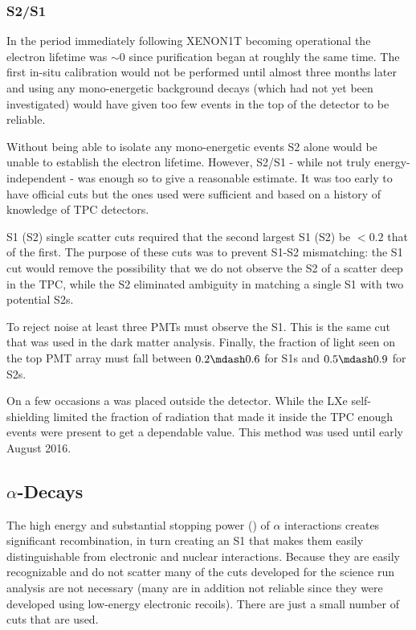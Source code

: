 \subsubsection{S2/S1}
\label{subsubsec:electron_lifetimes_measurement_ss}
In the period immediately following XENON1T becoming operational the electron lifetime was ${\sim} 0$ since purification began at roughly
the same time.  The first in-situ calibration would not be performed until almost three months later and using any mono-energetic
background decays (which had not yet been investigated) would have given too few events in the top of the detector to be reliable.

Without being able to isolate any mono-energetic events S2 alone would be unable to establish the electron lifetime.  However,
S2/S1 - while not truly energy-independent - was enough so to give a reasonable estimate.  It was too early to have official cuts but
the ones used were sufficient and based on a history of knowledge of TPC detectors.

S1 (S2) single scatter cuts required that the second largest S1 (S2) be $< 0.2$ that of the first.  The purpose of these cuts was to
prevent S1-S2 mismatching: the S1 cut would
remove the possibility that we do not observe the S2 of a scatter deep in the TPC, while the S2 eliminated ambiguity in matching a single
S1 with two potential S2s.

To reject noise at least three PMTs must observe the S1.  This is the same cut that was used in the dark matter analysis.  Finally, the
fraction of light seen on the top PMT array must fall between $0.2 \mdash 0.6$ for S1s and $0.5 \mdash 0.9$ for S2s.

On a few occasions a  was placed outside the detector.  While the LXe self-shielding limited the fraction of radiation that
made it inside the TPC enough events were present to get a dependable value.  This method was used until early August 2016.



\subsection{$\alpha$-Decays}
\label{subsec:electron_lifetimes_measurement_alphas}
The high energy and substantial stopping power () of $\alpha$ interactions creates significant
recombination, in turn creating an S1 that makes them easily distinguishable from electronic and nuclear
interactions.  Because they are easily recognizable and do not scatter many of the cuts developed for the science run analysis are not
necessary (many are in addition not reliable since they were developed using low-energy electronic recoils).  There are just a small
number of cuts that are used.

